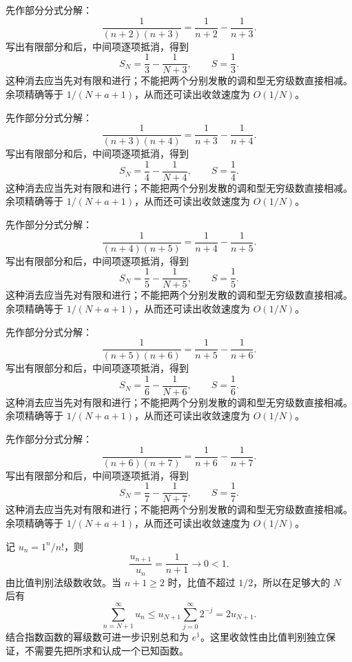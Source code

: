 \documentclass[UTF8,12pt,a4paper,fontset=fandol]{ctexart}
\begin{document}
\begin{solve}\label{ans:c24q8}
先作部分分式分解：
\[
\frac1{(n+2)(n+3)}=\frac1{n+2}-\frac1{n+3}.
\]
写出有限部分和后，中间项逐项抵消，得到
\[
S_N=\frac1{3}-\frac1{N+3},\qquad S=\frac{1}{3}.
\]
这种消去应当先对有限和进行；不能把两个分别发散的调和型无穷级数直接相减。余项精确等于 $1/(N+a+1)$，从而还可读出收敛速度为 $O(1/N)$。
\end{solve}

\begin{solve}\label{ans:c24q9}
先作部分分式分解：
\[
\frac1{(n+3)(n+4)}=\frac1{n+3}-\frac1{n+4}.
\]
写出有限部分和后，中间项逐项抵消，得到
\[
S_N=\frac1{4}-\frac1{N+4},\qquad S=\frac{1}{4}.
\]
这种消去应当先对有限和进行；不能把两个分别发散的调和型无穷级数直接相减。余项精确等于 $1/(N+a+1)$，从而还可读出收敛速度为 $O(1/N)$。
\end{solve}

\begin{solve}\label{ans:c24q10}
先作部分分式分解：
\[
\frac1{(n+4)(n+5)}=\frac1{n+4}-\frac1{n+5}.
\]
写出有限部分和后，中间项逐项抵消，得到
\[
S_N=\frac1{5}-\frac1{N+5},\qquad S=\frac{1}{5}.
\]
这种消去应当先对有限和进行；不能把两个分别发散的调和型无穷级数直接相减。余项精确等于 $1/(N+a+1)$，从而还可读出收敛速度为 $O(1/N)$。
\end{solve}

\begin{solve}\label{ans:c24q11}
先作部分分式分解：
\[
\frac1{(n+5)(n+6)}=\frac1{n+5}-\frac1{n+6}.
\]
写出有限部分和后，中间项逐项抵消，得到
\[
S_N=\frac1{6}-\frac1{N+6},\qquad S=\frac{1}{6}.
\]
这种消去应当先对有限和进行；不能把两个分别发散的调和型无穷级数直接相减。余项精确等于 $1/(N+a+1)$，从而还可读出收敛速度为 $O(1/N)$。
\end{solve}

\begin{solve}\label{ans:c24q12}
先作部分分式分解：
\[
\frac1{(n+6)(n+7)}=\frac1{n+6}-\frac1{n+7}.
\]
写出有限部分和后，中间项逐项抵消，得到
\[
S_N=\frac1{7}-\frac1{N+7},\qquad S=\frac{1}{7}.
\]
这种消去应当先对有限和进行；不能把两个分别发散的调和型无穷级数直接相减。余项精确等于 $1/(N+a+1)$，从而还可读出收敛速度为 $O(1/N)$。
\end{solve}

\begin{solve}\label{ans:c24q13}
记 $u_n=1^n/n!$，则
\[
\frac{u_{n+1}}{u_n}=\frac{1}{n+1}\longrightarrow0<1.
\]
由比值判别法级数收敛。当 $n+1\ge 2$ 时，比值不超过 $1/2$，所以在足够大的 $N$ 后有
\[
\sum_{n=N+1}^\infty u_n\le u_{N+1}\sum_{j=0}^\infty2^{-j}=2u_{N+1}.
\]
结合指数函数的幂级数可进一步识别总和为 $e^{1}$。这里收敛性由比值判别独立保证，不需要先把所求和认成一个已知函数。
\end{solve}
\end{document}
